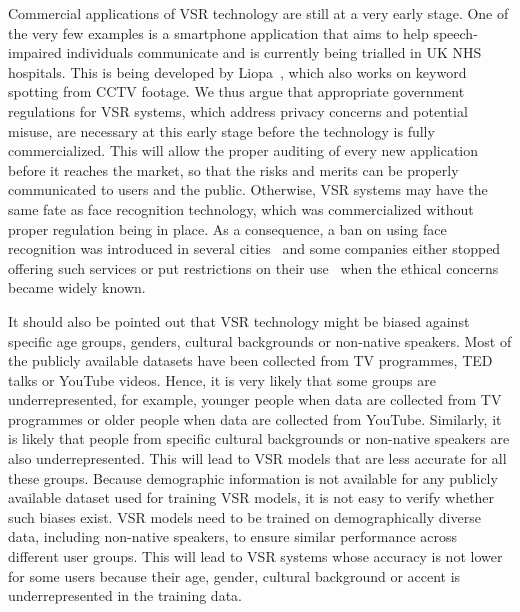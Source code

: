 \documentclass[twocolumn]{article}
\begin{document}
Commercial applications of VSR technology are still at a very early stage. One of the very few examples is a smartphone application that aims to help speech-impaired individuals communicate and is currently being trialled in UK NHS hospitals. This is being developed by Liopa~\cite{liopa}, which also works on keyword spotting from CCTV footage. We thus argue that appropriate government regulations for VSR systems, which address privacy concerns and potential misuse, are necessary at this early stage before the technology is fully commercialized. This will allow the proper auditing of every new application before it reaches the market, so that the risks and merits can be properly communicated to users and the public. Otherwise, VSR systems may have the same fate as face recognition technology, which was commercialized without proper regulation being in place. As a consequence, a ban on using face recognition was introduced in several cities~\cite{wired,cities} and some companies either stopped offering such services or put restrictions on their use~\cite{FB,Amazon,microsoft} when the ethical concerns became widely known.

It should also be pointed out that VSR technology might be biased against specific age groups, genders, cultural backgrounds or non-native speakers. Most of the publicly available datasets have been collected from TV programmes, TED talks or YouTube videos. Hence, it is very likely that some groups are underrepresented, for example, younger people when data are collected from TV programmes or older people when data are collected from YouTube. Similarly, it is likely that people from specific cultural backgrounds or non-native speakers are also underrepresented. This will lead to VSR models that are less accurate for all these groups. Because demographic information is not available for any publicly available dataset used for training VSR models, it is not easy to verify whether such biases exist. VSR models need to be trained on demographically diverse data, including non-native speakers, to ensure similar performance across different user groups. This will lead to VSR systems whose accuracy is not lower for some users because their age, gender, cultural background or accent is underrepresented in the training data.
\end{document}
